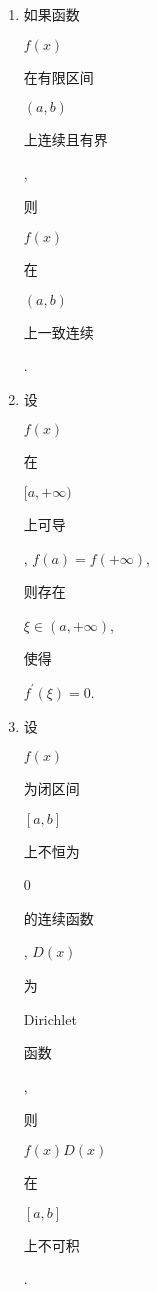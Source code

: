 \documentclass[10pt]{article}
\begin{document}
\begin{enumerate}
  \item \begin{CJK}{UTF8}{mj}如果函数\end{CJK} $f(x)$ \begin{CJK}{UTF8}{mj}在有限区间\end{CJK} $(a, b)$ \begin{CJK}{UTF8}{mj}上连续且有界\end{CJK}, \begin{CJK}{UTF8}{mj}则\end{CJK} $f(x)$ \begin{CJK}{UTF8}{mj}在\end{CJK} $(a, b)$ \begin{CJK}{UTF8}{mj}上一致连续\end{CJK}.

  \item \begin{CJK}{UTF8}{mj}设\end{CJK} $f(x)$ \begin{CJK}{UTF8}{mj}在\end{CJK} $[a,+\infty)$ \begin{CJK}{UTF8}{mj}上可导\end{CJK}, $f(a)=f(+\infty)$, \begin{CJK}{UTF8}{mj}则存在\end{CJK} $\xi \in(a,+\infty)$, \begin{CJK}{UTF8}{mj}使得\end{CJK} $f^{\prime}(\xi)=0$.

  \item \begin{CJK}{UTF8}{mj}设\end{CJK} $f(x)$ \begin{CJK}{UTF8}{mj}为闭区间\end{CJK} $[a, b]$ \begin{CJK}{UTF8}{mj}上不恒为\end{CJK} 0 \begin{CJK}{UTF8}{mj}的连续函数\end{CJK}, $D(x)$ \begin{CJK}{UTF8}{mj}为\end{CJK} Dirichlet \begin{CJK}{UTF8}{mj}函数\end{CJK}, \begin{CJK}{UTF8}{mj}则\end{CJK} $f(x) D(x)$ \begin{CJK}{UTF8}{mj}在\end{CJK} $[a, b]$ \begin{CJK}{UTF8}{mj}上不可积\end{CJK}.


\end{enumerate}
\end{document}
